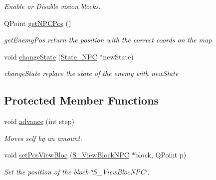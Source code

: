 \begin{DoxyCompactItemize}
\begin{DoxyCompactList}\small\item\em Enable or Disable vision blocks. \end{DoxyCompactList}\item 
Q\+Point \hyperlink{class_g___n_p_c_af22fec22cbb253daebe6b4dcd1beff68}{get\+N\+P\+C\+Pos} ()
\begin{DoxyCompactList}\small\item\em get\+Enemy\+Pos return the position with the correct coords on the map \end{DoxyCompactList}\item 
void \hyperlink{class_g___n_p_c_a6b11a0ad8e1db226439739d50b893109}{change\+State} (\hyperlink{class_state___n_p_c}{State\+\_\+\+N\+P\+C} $\ast$new\+State)
\begin{DoxyCompactList}\small\item\em change\+State replace the state of the enemy with new\+State \end{DoxyCompactList}\end{DoxyCompactItemize}
\subsection*{Protected Member Functions}
\begin{DoxyCompactItemize}
\item 
void \hyperlink{class_g___n_p_c_a02b5c497d062e0e1f26a47c2729e14d9}{advance} (int step)
\begin{DoxyCompactList}\small\item\em Moves self by an amount. \end{DoxyCompactList}\item 
void \hyperlink{class_g___n_p_c_a2b04f9184c5a2d923d3ea4e894d70009}{set\+Pos\+View\+Bloc} (\hyperlink{class_s___view_block_n_p_c}{S\+\_\+\+View\+Block\+N\+P\+C} $\ast$block, Q\+Point p)
\begin{DoxyCompactList}\small\item\em Set the position of the block \char`\"{}\+S\+\_\+\+View\+Bloc\+N\+P\+C\char`\"{}. \end{DoxyCompactList}\end{DoxyCompactItemize}
